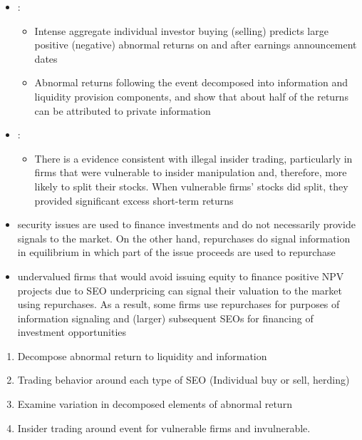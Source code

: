 \documentclass{beamer}
\begin{document}
\begin{frame}
	\begin{itemize}\scriptsize
		\item 	\cite{kaniel2012individual} :
		\begin{itemize}\tiny
			\item Intense
			aggregate individual investor buying (selling) predicts large positive (negative) abnormal returns on and after earnings announcement dates
			\item 
			Abnormal returns following the event decomposed  into information and liquidity provision components, and show that about half of the returns can be attributed to private information
		\end{itemize} 
	\item \cite{nguyen2017stock}:
	\begin{itemize}\tiny
		\item There is a evidence consistent with illegal insider trading,
	particularly in firms that were vulnerable to insider manipulation and, therefore, more likely to split
	their stocks. When vulnerable firms’ stocks did split, they provided significant excess short-term
	returns
		
	
	
	\end{itemize}
	\item \cite{constantinides1989optimal}
security issues are used to finance investments and do not necessarily provide signals to the
market. On the other hand, repurchases do signal information in equilibrium in which part of the
issue proceeds are used to repurchase
\item \cite{bond2016buying} undervalued firms that
would avoid issuing equity to finance positive NPV projects due to SEO underpricing can signal
their valuation to the market using repurchases. As a result, some firms use repurchases for
purposes of information signaling and (larger) subsequent SEOs for financing of investment opportunities
	\end{itemize}
\end{frame}
\begin{frame}
	\begin{enumerate}
		\item Decompose abnormal return to liquidity and information
		\item Trading behavior around each type of SEO (Individual buy or sell, herding)
		\item Examine variation in decomposed elements of abnormal return
		\item Insider trading around event for vulnerable firms and invulnerable.
	\end{enumerate}
\end{frame}
\end{document}
